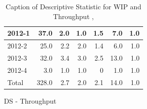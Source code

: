 \documentclass[UKenglish]{ifimaster}  %
\begin{document}
\begin{appendices}
\begin{table}[!htbp]
\begin{adjustwidth}{-2.5cm}{}
\begin{subfigure}[b]{0.3\textwidth}
{\begin{tabular}{ | l | r | r | r | r | r | r | }
2012-1 & 37.0 & 2.0 & 1.0 & 1.5 & 7.0 & 1.0\\ \hline
2012-2 & 25.0 & 2.2 & 2.0 & 1.4 & 6.0 & 1.0\\ \hline
2012-3 & 32.0 & 3.4 & 3.0 & 2.5 & 13.0 & 1.0\\ \hline
2012-4 & 3.0 & 1.0 & 1.0 & 0 & 1.0 & 1.0\\ \hline
Total & 328.0 & 2.7 & 2.0 & 2.1 & 14.0 & 1.0\\ \hline
\end{tabular}
}
\caption{DS - Throughput}
 \label{DS:Throughput:7}
\end{subfigure}
\end{adjustwidth}
\caption[Optional caption for list of figures]{Caption of Descriptive Statistic for WIP and Throughput  , }
\label{DS:7:1}
\end{table}


\end{appendices}
\end{document}
